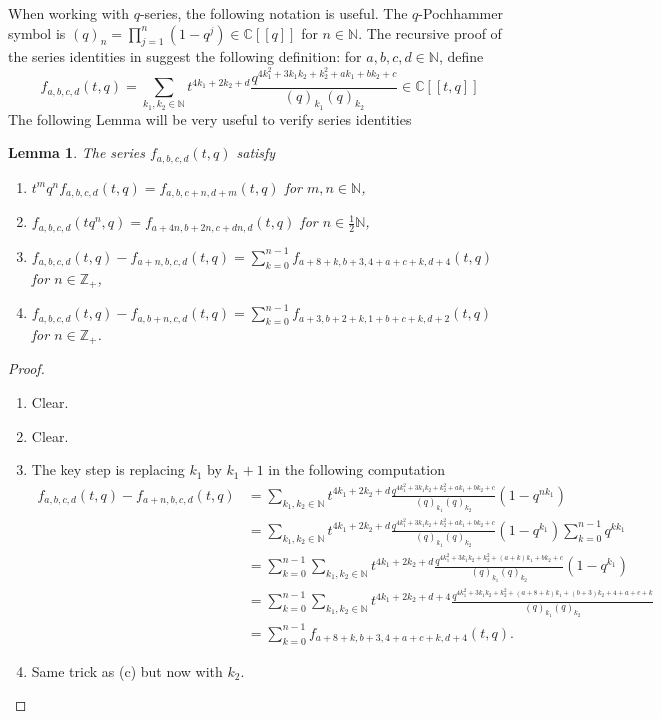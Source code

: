 \documentclass[12pt,a4paper]{article}
\newtheorem{lemma}{Lemma}
\begin{document}
When working with $q$-series, the following notation is useful.
The $q$-Pochhammer symbol is $(q)_n=\prod_{j=1}^n(1-q^j)\in \mathbb{C}[[q]]$ for $n\in\mathbb{N}$.
The recursive proof of the series identities in \cite{andrews_singular_2022} suggest the following definition: for $a,b,c,d\in \mathbb{N}$, define
\begin{equation*}
  f_{a,b,c,d}(t,q)=\sum_{k_1,k_2\in \mathbb{N}}t^{4k_1+2k_2+d}\frac{q^{4k_1^2+3k_1k_2+k_2^2+ak_1+bk_2+c}}{(q)_{k_1}(q)_{k_2}}\in \mathbb{C}[[t,q]]
\end{equation*}
The following Lemma will be very useful to verify series identities
\begin{lemma}
  \label{lmm:1}
  The series $f_{a,b,c,d}(t,q)$ satisfy
  \begin{enumerate}[label={(\alph*)}]
  \item $t^mq^nf_{a,b,c,d}(t,q)=f_{a,b,c+n,d+m}(t,q)$ for $m,n\in \mathbb{N}$,
  \item $f_{a,b,c,d}(tq^n,q)=f_{a+4n,b+2n,c+dn,d}(t,q)$ for $n\in \frac{1}{2}\mathbb{N}$,
  \item $f_{a,b,c,d}(t,q)-f_{a+n,b,c,d}(t,q)=\sum_{k=0}^{n-1}f_{a+8+k,b+3,4+a+c+k,d+4}(t,q)$ for $n\in \mathbb{Z}_+$,
  \item $f_{a,b,c,d}(t,q)-f_{a,b+n,c,d}(t,q)=\sum_{k=0}^{n-1}f_{a+3,b+2+k,1+b+c+k,d+2}(t,q)$ for $n\in \mathbb{Z}_+$.
  \end{enumerate}
\end{lemma}
\begin{proof}
  \begin{enumerate}[label=(\alph*)]
  \item Clear.
  \item Clear.
  \item The key step is replacing $k_1$ by $k_1+1$ in the following computation
    \begin{align*}
      f_{a,b,c,d}(t,q)-f_{a+n,b,c,d}(t,q)&=\sum_{k_1,k_2\in\mathbb{N}}t^{4k_1+2k_2+d}\frac{q^{4k_1^2+3k_1k_2+k_2^2+ak_1+bk_2+c}}{(q)_{k_1}(q)_{k_2}}(1-q^{nk_1}) \\
      &=\sum_{k_1,k_2\in\mathbb{N}}t^{4k_1+2k_2+d}\frac{q^{4k_1^2+3k_1k_2+k_2^2+ak_1+bk_2+c}}{(q)_{k_1}(q)_{k_2}}(1-q^{k_1})\sum_{k=0}^{n-1}q^{kk_1} \\
      &=\sum_{k=0}^{n-1}\sum_{k_1,k_2\in\mathbb{N}}t^{4k_1+2k_2+d}\frac{q^{4k_1^2+3k_1k_2+k_2^2+(a+k)k_1+bk_2+c}}{(q)_{k_1}(q)_{k_2}}(1-q^{k_1}) \\
      &=\sum_{k=0}^{n-1}\sum_{k_1,k_2\in\mathbb{N}}t^{4k_1+2k_2+d+4}\frac{q^{4k_1^2+3k_1k_2+k_2^2+(a+8+k)k_1+(b+3)k_2+4+a+c+k}}{(q)_{k_1}(q)_{k_2}} \\
      &=\sum_{k=0}^{n-1}f_{a+8+k,b+3,4+a+c+k,d+4}(t,q).
    \end{align*}
  \item Same trick as (c) but now with $k_2$.
  \end{enumerate}
\end{proof}
\end{document}
